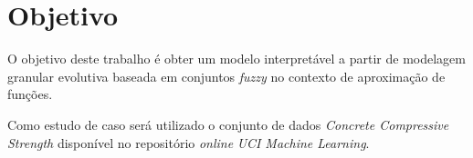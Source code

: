 \documentclass[12pt, a4paper]{article}
\begin{document}
\section{Objetivo}

\hspace{0.4cm} O objetivo deste trabalho é obter um modelo interpretável a partir de modelagem granular evolutiva baseada em conjuntos \textit{fuzzy} no contexto de aproximação de funções.

Como estudo de caso será utilizado o conjunto de dados \textit{Concrete Compressive Strength} disponível no repositório \textit{online} \textit{UCI Machine Learning}.



\end{document}
